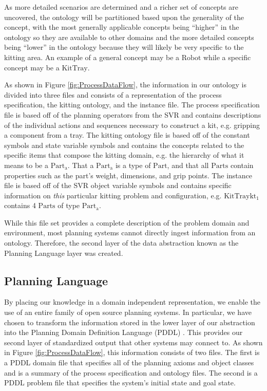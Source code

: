 \documentclass[a4paper, 10pt, conference]{ieeeconf}      %
\begin{document}
As more detailed scenarios are determined and a richer set of concepts are uncovered, the ontology will be partitioned based upon the generality of the concept, with the most generally applicable concepts being ``higher'' in the ontology so they are available to other domains and the more detailed concepts being ``lower'' in the ontology because they will likely be very specific to the kitting area. An example of a general concept may be a $\mathrm{Robot}$ while a specific concept may be a $\mathrm{KitTray}$.

As shown in Figure \ref{fig:ProcessDataFlow}, the information in our ontology is divided into three files and consists of a representation of the process specification,
the kitting ontology, and the instance file. The process specification file is based off of the planning operators from the SVR and contains descriptions of
the individual actions and sequences necessary to construct a kit, e.g. gripping a component from a tray. The kitting ontology file is based off of the constant symbols and
state variable symbols and contains the concepts related to the specific items
that compose the kitting domain, e.g. the hierarchy of what it means to be a $\mathrm{Part_a}$. That a $\mathrm{Part_a}$ is a type of $\mathrm{Part}$, and that
all $\mathrm{Parts}$ contain properties such as the part's weight, dimensions, and grip points. The instance file is based off of the SVR object variable symbols and
contains specific information on {\it this} particular kitting problem and configuration, e.g. $\mathrm{KitTray kt_1}$ contains 4 $\mathrm{Parts}$ of type $\mathrm{Part_a}$.

While this file set provides a complete description of the problem domain and environment, most planning systems cannot directly ingest information from an ontology.
Therefore, the second layer of the data abstraction known as the Planning Language layer was created.

\subsection{Planning Language}
By placing our knowledge in a domain independent representation, we enable the use of an entire family of open source planning systems.
In particular, we have chosen to transform the information stored in the lower layer of our abstraction into the Planning Domain Definition Language (PDDL) \cite{PDDL}.
This provides our second layer of standardized output that other systems may connect to. As shown in Figure \ref{fig:ProcessDataFlow}, this information consists of two files. The first
is a PDDL domain file that specifies all of the planning axioms and object classes and is a summary of the process specification and ontology files. The second is a PDDL problem file that
specifies the system's initial state and goal state.
\end{document}
